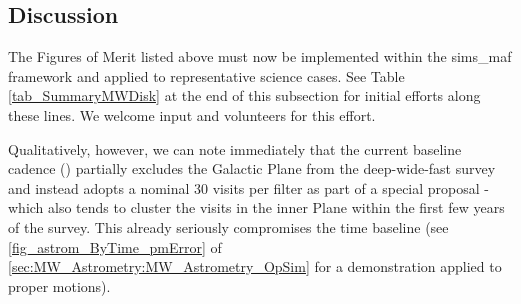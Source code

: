 



\subsection{Discussion}
\label{sec:\secname:MW_Disk_discussion}

The Figures of Merit listed above must now be implemented within the
sims\_maf framework and applied to representative science cases.
See Table \ref{tab_SummaryMWDisk} at the end of this subsection for
initial efforts along these lines. We welcome input and volunteers for
this effort.

Qualitatively, however, we can note immediately that the current
baseline cadence () partially excludes the
Galactic Plane from the deep-wide-fast survey and instead adopts a
nominal 30 visits per filter as part of a special proposal - which
also tends to cluster the visits in the inner Plane within the first
few years of the survey. This already seriously compromises the time
baseline (see \autoref{fig_astrom_ByTime_pmError} of
\autoref{sec:MW_Astrometry:MW_Astrometry_OpSim} for a demonstration applied to
proper motions).





